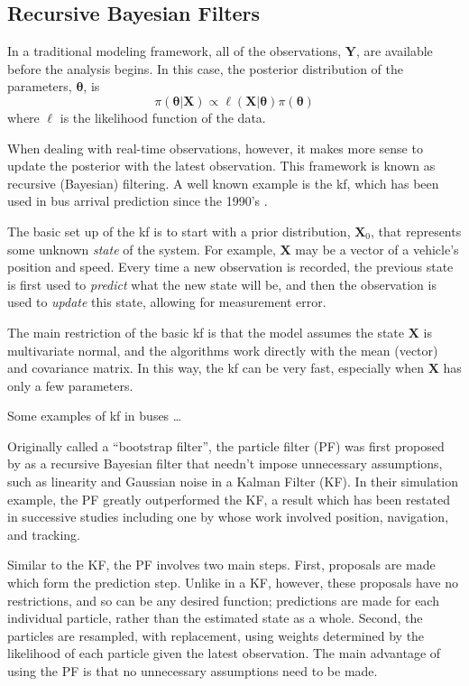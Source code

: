 \documentclass[12pt,a4paper]{article}
\newcommand{\bY}{\mathbf{Y}}
\newcommand{\bX}{\mathbf{X}}
\newcommand{\btheta}{\boldsymbol{\theta}}
\begin{document}
\subsection{Recursive Bayesian Filters}

In a traditional modeling framework, all of the observations, $\bY$, are available before
the analysis begins.
In this case, the posterior distribution of the parameters, $\btheta$, is
\begin{equation}
  \label{eq:bayes_theorem}
  \pi(\btheta|\bX) \propto \ell(\bX | \btheta) \pi(\btheta)
\end{equation}
where $\ell$ is the likelihood function of the data.

When dealing with real-time observations, however, it makes more sense to update
the posterior with the latest observation.
This framework is known as recursive (Bayesian) filtering.
A well known example is the \gls{kf},
which has been used in bus arrival prediction since the 1990's \citep{cn}.

The basic set up of the \gls{kf} is to start with a prior distribution,
$\bX_0$, that represents some unknown \emph{state} of the system.
For example, $\bX$ may be a vector of a vehicle's position and speed.
Every time a new observation is recorded, the previous state is first used
to \emph{predict} what the new state will be, 
and then the observation is used to \emph{update} this state,
allowing for measurement error.

The main restriction of the basic \gls{kf} is that the model assumes the state $\bX$ 
is multivariate normal, and the algorithms work directly with the mean (vector)
and covariance matrix.
In this way, the \gls{kf} can be very fast, especially when $\bX$ has only a few
parameters.


Some examples of \gls{kf} in buses \ldots



Originally called a ``bootstrap filter'', the particle filter (PF) was first proposed by
\cite{gordon-etal:1993} as a recursive Bayesian filter that needn't impose unnecessary assumptions,
such as linearity and Gaussian noise in a Kalman Filter (KF).
In their simulation example, the PF greatly outperformed the KF,
a result which has been restated in successive studies
including one by \cite{gustafsson-etal:2002} whose work involved position, navigation, and tracking.


Similar to the KF, the PF involves two main steps.
First, proposals are made which form the prediction step.
Unlike in a KF, however, these proposals have no restrictions, and so can be any
desired function;
predictions are made for each individual particle, rather than the estimated state as a whole.
Second, the particles are resampled, with replacement, using weights determined by the likelihood
of each particle given the latest observation.
The main advantage of using the PF is that no unnecessary assumptions need to be made. 
\end{document}
